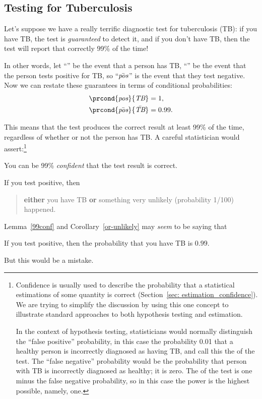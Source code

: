 \subsection{Testing for Tuberculosis}

Let's suppose we have a really terrific diagnostic test for
tuberculosis (TB): if you have TB, the test is \emph{guaranteed} to
detect it, and if you don't have TB, then the test will report that
correctly 99\% of the time!

In other words, let ``\TB'' be the event that a person has TB,
``\testplus'' be the event that the person tests positive for TB, so
``$\bar{\emph{pos}}$'' is the event that they test negative.  Now we can restate
these guarantees in terms of conditional probabilities:
\begin{align}
\prcond{\testplus}{\TB} & = 1,\label{pr+TB}\\
\prcond{\bar{\testplus}}{\bar{\TB}} & = 0.99.\label{pr-barTB}
\end{align}

This means that the test produces the correct result at least 99\% of
the time, regardless of whether or not the person has TB.  A careful
statistician would assert:\footnote{Confidence is usually used to
  describe the probability that a statistical estimations of some
  quantity is correct (Section~\ref{sec: estimation_confidence}).
  We are trying to simplify the discussion by using this one concept
  to illustrate standard approaches to both hypothesis testing and
  estimation.

  In the context of hypothesis testing, statisticians would normally
  distinguish the ``false positive'' probability, in this case the
  probability 0.01 that a healthy person is incorrectly diagnosed as
  having TB, and call this the  of the test.  The
  ``false negative'' probability would be the probability that person
  with TB is incorrectly diagnosed as healthy; it is zero.  The
   of the test is one minus the false negative
  probability, so in this case the power is the highest possible,
  namely, one.}

\begin{lemma*}\label{99conf}
You can be 99\% \emph{confident} that the test result is correct.
\end{lemma*}
\begin{corollary}\label{or-unlikely}
If you test positive, then
\begin{quote}
\textbf{either} you have TB \textbf{or} something very unlikely
(probability 1/100) happened.
\end{quote}
\end{corollary}
Lemma~\ref{99conf} and Corollary~\ref{or-unlikely} may \emph{seem} to
be saying that
\begin{falseclm*}
If you test positive, then the probability that you have TB is $0.99$.
\end{falseclm*}
But this would be a mistake.

